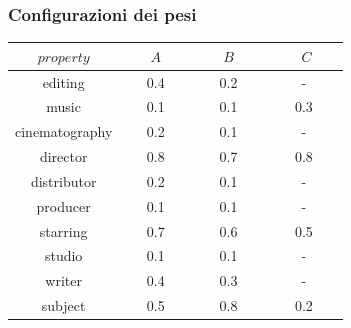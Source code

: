 \documentclass{beamer}
\begin{document}
	
\begin{frame}
		\frametitle{Configurazioni dei pesi}
		
		\begin{center}
			\begin{tabular}{c | ccc}
				\toprule
				$property$ & ~~~$A$~~~ & ~~~$B$~~~ & ~~~ $C$~~~ \\
				\hline
				editing			& 0.4 & 0.2 & - \\
				music			& 0.1 & 0.1 & 0.3 \\
				cinematography 	& 0.2 & 0.1 & - \\
				director		& 0.8 & 0.7 & 0.8 \\
				distributor 	& 0.2 & 0.1 & - \\
				producer		& 0.1 & 0.1 & - \\
				starring		& 0.7 & 0.6 & 0.5 \\
				studio			& 0.1 & 0.1 & - \\
				writer			& 0.4 & 0.3 & - \\
				subject			& 0.5 & 0.8 & 0.2 \\
				\bottomrule
			\end{tabular}
		\end{center}
	\end{frame}
	
\end{document}
